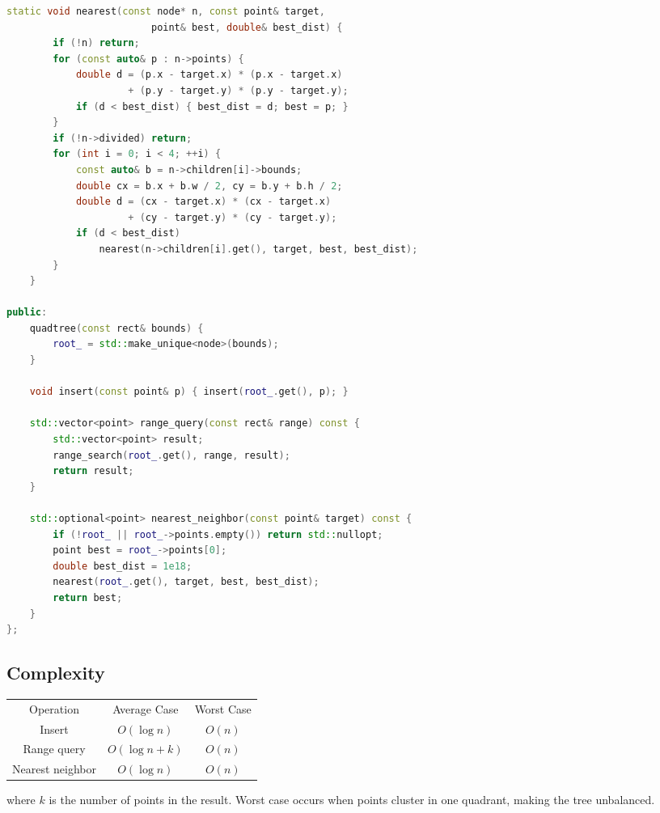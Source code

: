 \begin{lstlisting}[language=C++]
    static void nearest(const node* n, const point& target,
                         point& best, double& best_dist) {
        if (!n) return;
        for (const auto& p : n->points) {
            double d = (p.x - target.x) * (p.x - target.x)
                     + (p.y - target.y) * (p.y - target.y);
            if (d < best_dist) { best_dist = d; best = p; }
        }
        if (!n->divided) return;
        for (int i = 0; i < 4; ++i) {
            const auto& b = n->children[i]->bounds;
            double cx = b.x + b.w / 2, cy = b.y + b.h / 2;
            double d = (cx - target.x) * (cx - target.x)
                     + (cy - target.y) * (cy - target.y);
            if (d < best_dist)
                nearest(n->children[i].get(), target, best, best_dist);
        }
    }

public:
    quadtree(const rect& bounds) {
        root_ = std::make_unique<node>(bounds);
    }

    void insert(const point& p) { insert(root_.get(), p); }

    std::vector<point> range_query(const rect& range) const {
        std::vector<point> result;
        range_search(root_.get(), range, result);
        return result;
    }

    std::optional<point> nearest_neighbor(const point& target) const {
        if (!root_ || root_->points.empty()) return std::nullopt;
        point best = root_->points[0];
        double best_dist = 1e18;
        nearest(root_.get(), target, best, best_dist);
        return best;
    }
};
\end{lstlisting}

\subsection{Complexity}

\begin{center}
\begin{tabular}{ccc}
\toprule
Operation & Average Case & Worst Case \\
Insert & $O(\log n)$ & $O(n)$ \\
Range query & $O(\log n + k)$ & $O(n)$ \\
Nearest neighbor & $O(\log n)$ & $O(n)$ \\
\bottomrule
\end{tabular}
\end{center}

where $k$ is the number of points in the result. Worst case occurs when points cluster in one quadrant, making the tree unbalanced.

